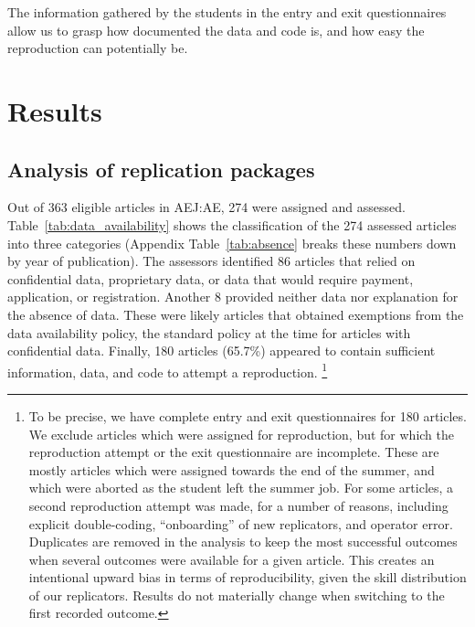 \documentclass{cje} %
\theoremstyle{plain}%
\theoremstyle{definition}
\theoremstyle{remark}
\begin{document}
The information gathered by the students in the entry and exit questionnaires allow us to grasp how documented the data and code is, and how easy the reproduction can potentially be.
\FloatBarrier

\section{Results}\label{sec:results}

\subsection{Analysis of replication packages}


Out of 363 eligible articles in AEJ:AE, 274 were assigned and assessed. Table~\ref{tab:data_availability} shows the classification of the 274 assessed articles into three categories (Appendix Table~\ref{tab:absence} breaks these numbers down by year of publication). The assessors identified 86 articles that relied on confidential data, proprietary data, or data that would require payment, application, or registration. Another 8 provided neither data nor explanation for the absence of data. These were likely articles that obtained exemptions from the data availability policy, the standard policy at the time for articles with confidential data. Finally, 180 articles (65.7\%) appeared to contain sufficient information, data, and code to attempt a reproduction.%
%
\footnote{To be precise, we have complete entry and exit questionnaires for 180 articles. We exclude articles which were assigned for reproduction, but for which the reproduction attempt or the exit questionnaire are incomplete. These are mostly articles which were assigned towards the end of the summer, and which were aborted as the student left the summer job.%
 For some  articles, a second reproduction attempt was made,  for a number of reasons, including explicit double-coding, ``onboarding'' of new replicators, and operator error. Duplicates are removed in the analysis to keep the most successful outcomes when several outcomes were available for a given article. This creates an intentional upward bias in terms of reproducibility, given the skill distribution of our replicators. Results do not materially change when switching to the first recorded outcome.}
\end{document}
